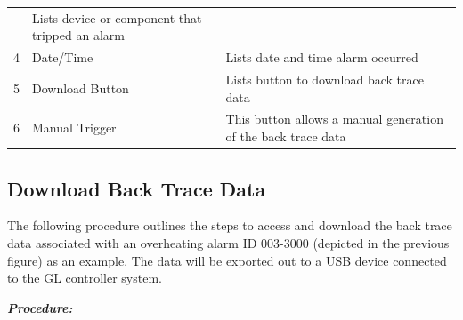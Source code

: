 \begin{longtable}[]{@{}lll@{}}
\begin{minipage}[t]{0.23\columnwidth}
\end{minipage} & \begin{minipage}[t]{0.65\columnwidth}\raggedright
Lists device or component that tripped an alarm\strut
\end{minipage}\tabularnewline
\begin{minipage}[t]{0.04\columnwidth}\raggedright
4\strut
\end{minipage} & \begin{minipage}[t]{0.23\columnwidth}\raggedright
Date/Time\strut
\end{minipage} & \begin{minipage}[t]{0.65\columnwidth}\raggedright
Lists date and time alarm occurred\strut
\end{minipage}\tabularnewline
\begin{minipage}[t]{0.04\columnwidth}\raggedright
5\strut
\end{minipage} & \begin{minipage}[t]{0.23\columnwidth}\raggedright
Download Button\strut
\end{minipage} & \begin{minipage}[t]{0.65\columnwidth}\raggedright
Lists button to download back trace data\strut
\end{minipage}\tabularnewline
\begin{minipage}[t]{0.04\columnwidth}\raggedright
6\strut
\end{minipage} & \begin{minipage}[t]{0.23\columnwidth}\raggedright
Manual Trigger\strut
\end{minipage} & \begin{minipage}[t]{0.65\columnwidth}\raggedright
This button allows a manual generation of the back trace data\strut
\end{minipage}\tabularnewline
\bottomrule
\end{longtable}


\subsection{Download Back Trace
Data}

The following procedure outlines the steps to access and download the
back trace data associated with an overheating alarm ID 003-3000
(depicted in the previous figure) as an example. The data will be
exported out to a USB device connected to the GL controller system.

\textbf{\emph{Procedure:}}

